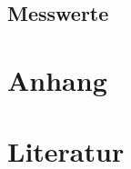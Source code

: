 \documentclass[11pt,a4paper]{article}
\begin{document}
\subsection{Messwerte}



\newpage
\section{Anhang}
%

\nocite{*}
\newpage
\section{Literatur}
\newpage
%
\end{document}
